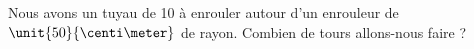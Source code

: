
\begin{exercice}\label{exosmath-0361}

    Nous avons un tuyau de \unit{10}{\meter} à enrouler autour d'un enrouleur de \( \unit{50}{\centi\meter}\) de rayon. Combien de tours allons-nous faire ?

\end{exercice}
